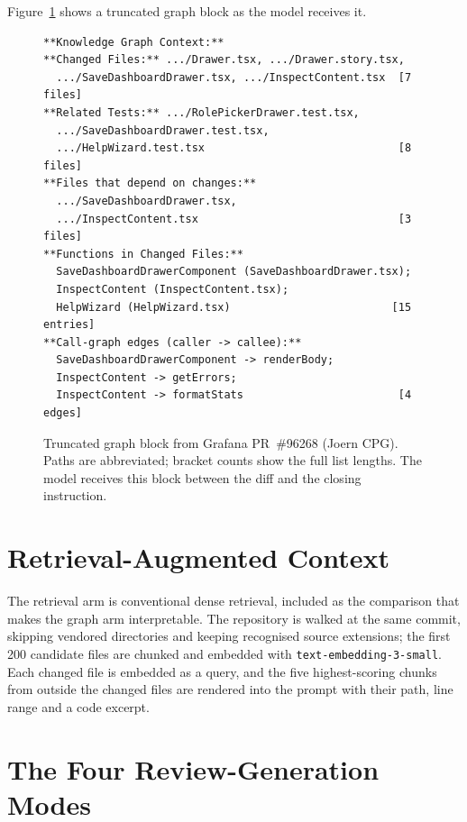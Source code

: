 Figure~\ref{fig:kg-block-example} shows a truncated graph block as the model
receives it.

\begin{figure}[htbp]
\centering
\begin{minipage}{0.92\textwidth}
{\footnotesize
\begin{verbatim}
**Knowledge Graph Context:**
**Changed Files:** .../Drawer.tsx, .../Drawer.story.tsx,
  .../SaveDashboardDrawer.tsx, .../InspectContent.tsx  [7 files]
**Related Tests:** .../RolePickerDrawer.test.tsx,
  .../SaveDashboardDrawer.test.tsx,
  .../HelpWizard.test.tsx                              [8 files]
**Files that depend on changes:**
  .../SaveDashboardDrawer.tsx,
  .../InspectContent.tsx                               [3 files]
**Functions in Changed Files:**
  SaveDashboardDrawerComponent (SaveDashboardDrawer.tsx);
  InspectContent (InspectContent.tsx);
  HelpWizard (HelpWizard.tsx)                         [15 entries]
**Call-graph edges (caller -> callee):**
  SaveDashboardDrawerComponent -> renderBody;
  InspectContent -> getErrors;
  InspectContent -> formatStats                        [4 edges]
\end{verbatim}
}
\end{minipage}
\caption{Truncated graph block from Grafana PR~\#96268 (Joern CPG). Paths
         are abbreviated; bracket counts show the full list lengths. The model
         receives this block between the diff and the closing instruction.}
\label{fig:kg-block-example}
\end{figure}

\section{Retrieval-Augmented Context}
\label{sec:approach-rag}

The retrieval arm is conventional dense retrieval, included as the comparison
that makes the graph arm interpretable. The repository is walked at the same
commit, skipping vendored directories and keeping recognised source
extensions; the first 200 candidate files are chunked and embedded with
\texttt{text-embedding-3-small}. Each changed file is embedded as a query,
and the five highest-scoring chunks from outside the changed files are
rendered into the prompt with their path, line range and a code excerpt.

\section{The Four Review-Generation Modes}
\label{sec:approach-modes}

